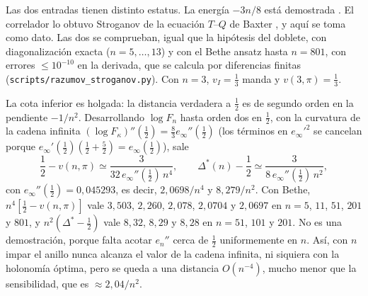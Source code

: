 \documentclass[11pt,a4paper]{article}
\theoremstyle{remark}
\begin{document}
Las dos entradas tienen distinto estatus. La energía $-3n/8$ está demostrada \cite{fsz}. El correlador
lo obtuvo Stroganov de la ecuación $T$--$Q$ de Baxter \cite{stroganov}, y aquí se toma como dato.
Las dos se comprueban, igual que la hipótesis del doblete, con diagonalización exacta ($n=5,\dots,13$)
y con el Bethe ansatz hasta $n=801$, con errores $\le10^{-10}$ en la derivada, que se calcula por diferencias
finitas (\texttt{scripts/razumov\_stroganov.py}). Con $n=3$, $v_I=\tfrac13$ manda y
$v(3,\pi)=\tfrac13$.

La cota inferior es holgada: la distancia verdadera a $\tfrac12$ es de segundo orden en la pendiente $-1/n^2$.
Desarrollando $\log F_n$ hasta orden dos en $\tfrac12$, con la curvatura de la cadena infinita
$(\log F_\kappa)''(\tfrac12)=\tfrac83e_\infty''(\tfrac12)$ (los términos en $e_\infty'^2$ se cancelan
porque $e_\infty'(\tfrac12)(\tfrac12+\tfrac52)=e_\infty(\tfrac12)$), sale
\[
  \frac12-v(n,\pi)\simeq\frac3{32\,e_\infty''(\tfrac12)\,n^4},\qquad
  \Delta^\ast(n)-\frac12\simeq\frac3{8\,e_\infty''(\tfrac12)\,n^2},
\]
con $e_\infty''(\tfrac12)=0{,}045293$, es decir, $2{,}0698/n^4$ y $8{,}279/n^2$. Con Bethe,
$n^4[\tfrac12-v(n,\pi)]$ vale $3{,}503$, $2{,}260$, $2{,}078$, $2{,}0704$ y $2{,}0697$ en $n=5$, $11$,
$51$, $201$ y $801$, y $n^2(\Delta^\ast-\tfrac12)$ vale $8{,}32$, $8{,}29$ y $8{,}28$ en $n=51$, $101$
y $201$. No es una demostración, porque falta acotar $e_n''$ cerca de $\tfrac12$ uniformemente en
$n$. Así, con $n$ impar el anillo nunca alcanza el valor de la cadena infinita, ni siquiera con la
holonomía óptima, pero se queda a una distancia $O(n^{-4})$, mucho menor que la sensibilidad, que
es $\approx2{,}04/n^2$.
\end{document}

